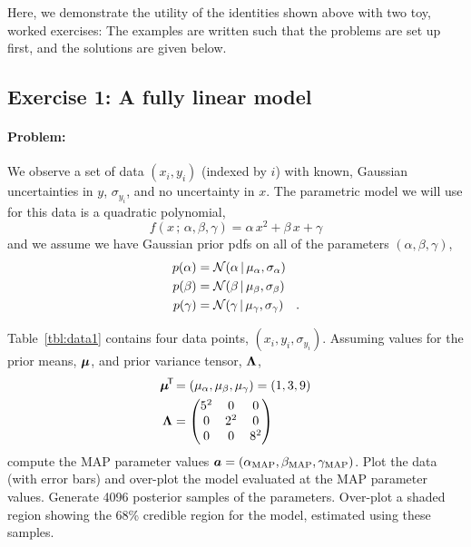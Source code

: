 Here, we demonstrate the utility of the identities shown above with two toy,
worked exercises: The examples are written such that the problems are set up
first, and the solutions are given below.


\subsection{Exercise 1: A fully linear model}

\paragraph{Problem:} We observe a set of data $(x_i, y_i)$ (indexed by $i$) with
known, Gaussian uncertainties in $y$, $\sigma_{y_i}$, and no uncertainty in $x$.
The parametric model we will use for this data is a quadratic polynomial,
\begin{equation}
  f(x \,;\, \alpha, \beta, \gamma) = \alpha\,x^2 + \beta\,x + \gamma
\end{equation}
and we assume we have Gaussian prior pdfs on all of the parameters $(\alpha,
\beta, \gamma)$,
\begin{align}
  p(\alpha) &= \mathcal{N}\!\,(\alpha \,|\, \mu_\alpha, \sigma_\alpha)\\
  p(\beta) &= \mathcal{N}\!\,(\beta \,|\, \mu_\beta, \sigma_\beta)\\
  p(\gamma) &= \mathcal{N}\!\,(\gamma \,|\, \mu_\gamma, \sigma_\gamma)
  \quad .
\end{align}

Table~\ref{tbl:data1} contains four data points, $(x_i, y_i, \sigma_{y_i})$.
Assuming values for the prior means, $\boldsymbol{\mu}$, and prior variance tensor,
$\mathbf{\Lambda}$,
\begin{align}
  \boldsymbol{\mu}^{\!\mathsf{T}\!} &= (\mu_\alpha, \mu_\beta, \mu_\gamma) = (1, 3, 9)\\
  \mathbf{\Lambda} &=
    \begin{pmatrix}
      5^2 & 0 & 0\\
      0 & 2^2 & 0\\
      0 & 0 & 8^2
    \end{pmatrix}\\
\end{align}
compute the MAP parameter values $\boldsymbol{a} = (\alpha_{\rm MAP}, \beta_{\rm MAP},
\gamma_{\rm MAP})$.
Plot the data (with error bars) and over-plot the model evaluated at the
MAP parameter values.
Generate 4096 posterior samples of the parameters.
Over-plot a shaded region showing the 68\% credible region for the model,
estimated using these samples.

